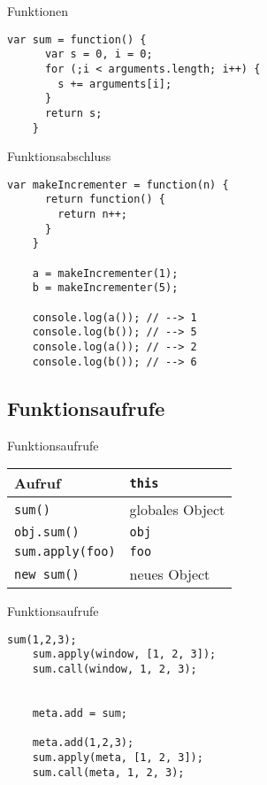 \begin{frame}[fragile]{Funktionen}
  \begin{lstlisting}[gobble=4]
    var sum = function() {
      var s = 0, i = 0;
      for (;i < arguments.length; i++) {
        s += arguments[i];
      }
      return s;
    }
  \end{lstlisting}
\end{frame}

\begin{frame}[fragile]{Funktionsabschluss}
  \begin{lstlisting}[gobble=4]
    var makeIncrementer = function(n) {
      return function() {
        return n++;
      }
    }
    
    a = makeIncrementer(1);
    b = makeIncrementer(5);
    
    console.log(a()); // --> 1
    console.log(b()); // --> 5
    console.log(a()); // --> 2
    console.log(b()); // --> 6
  \end{lstlisting}
\end{frame}

\subsection{Funktionsaufrufe}

\begin{frame}{Funktionsaufrufe}
  \begin{tabular}{ll}
    Aufruf & \lstinline-this- \\ \hline
    \lstinline-sum()- & globales Object \\
    \lstinline-obj.sum()- & \lstinline-obj- \\
    \lstinline-sum.apply(foo)- & \lstinline-foo- \\
    \lstinline-new sum()- & neues Object
  \end{tabular}
\end{frame}

\begin{frame}[fragile]{Funktionsaufrufe}
  \begin{lstlisting}[gobble=4]
    sum(1,2,3);
    sum.apply(window, [1, 2, 3]);
    sum.call(window, 1, 2, 3);
    
    
    meta.add = sum;
    
    meta.add(1,2,3);
    sum.apply(meta, [1, 2, 3]);
    sum.call(meta, 1, 2, 3);
  \end{lstlisting}
\end{frame}

